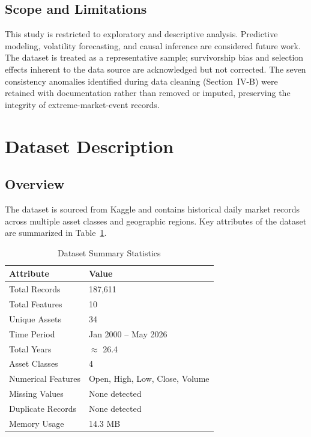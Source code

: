 \documentclass[10pt,a4paper,twocolumn]{article}
\begin{document}
\subsection{Scope and Limitations}

This study is restricted to exploratory and descriptive analysis. Predictive modeling, volatility forecasting, and causal inference are considered future work. The dataset is treated as a representative sample; survivorship bias and selection effects inherent to the data source are acknowledged but not corrected. The seven consistency anomalies identified during data cleaning (Section~IV-B) were retained with documentation rather than removed or imputed, preserving the integrity of extreme-market-event records.

\section{Dataset Description}

\subsection{Overview}

The dataset is sourced from Kaggle and contains historical daily market records across multiple asset classes and geographic regions. Key attributes of the dataset are summarized in Table~\ref{tab:dataset_summary}.

\begin{table}[H]
\centering
\caption{Dataset Summary Statistics}
\label{tab:dataset_summary}
\small
\begin{tabular}{@{}ll@{}}
\toprule
\textbf{Attribute} & \textbf{Value} \\
\midrule
Total Records       & 187,611 \\
Total Features      & 10 \\
Unique Assets       & 34 \\
Time Period         & Jan 2000 -- May 2026 \\
Total Years         & $\approx$ 26.4 \\
Asset Classes       & 4 \\
Numerical Features  & Open, High, Low, Close, Volume \\
Missing Values      & None detected \\
Duplicate Records   & None detected \\
Memory Usage        & 14.3 MB \\
\bottomrule
\end{tabular}
\end{table}
\end{document}

